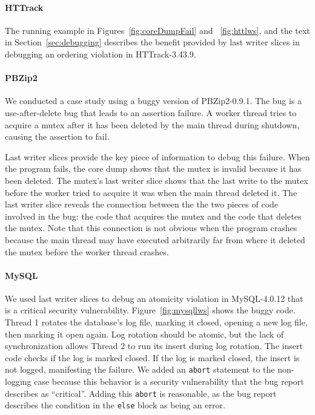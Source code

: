 \documentclass[preprint,9pt]{sigplanconf}
\begin{document}
\paragraph{HTTrack}
The running example in Figures~\ref{fig:coreDumpFail} and ~\ref{fig:httlws},
and the text in Section~\ref{sec:debugging} describes the benefit provided by
last writer slices in debugging an ordering violation in HTTrack-3.43.9.  

\paragraph{PBZip2}
We conducted a case study using a buggy version of PBZip2-0.9.1.    The bug is
a use-after-delete bug that leads to an assertion failure.  A worker thread
tries to acquire a mutex after it has been deleted by the main thread during
shutdown, causing the assertion to fail.  

Last writer slices provide the key piece of information to debug this failure.
When the program fails, the core dump shows that the mutex is invalid because
it has been deleted.  The mutex's last writer slice shows that the last write
to the mutex before the worker tried to acquire it was when the main thread
deleted it.  The last writer slice reveals the connection between the the two
pieces of code involved in the bug: the code that acquires the mutex and the
code that deletes the mutex.  Note that this connection is not obvious when the
program crashes because the main thread may have executed arbitrarily far from
where it deleted the mutex before the worker thread crashes.  

\paragraph{MySQL}

We used last writer slices to debug an atomicity violation in MySQL-4.0.12 that
is a critical security vulnerability.  Figure~\ref{fig:mysqllws} shows the
buggy code.  Thread 1 rotates the database's log file, marking it closed,
opening a new log file, then marking it open again.  Log rotation should be
atomic, but the lack of synchronization allows Thread 2 to run its insert
during log rotation.  The insert code checks if the log is marked closed. If
the log is marked closed, the insert is not logged, manifesting the failure.
We added an {\tt abort} statement to the non-logging case because this behavior
is a security vulnerability that the bug report describes as ``critical''.
Adding this {\tt abort} is reasonable, as the bug report describes the
condition in the {\tt else} block as being an error.
\end{document}
